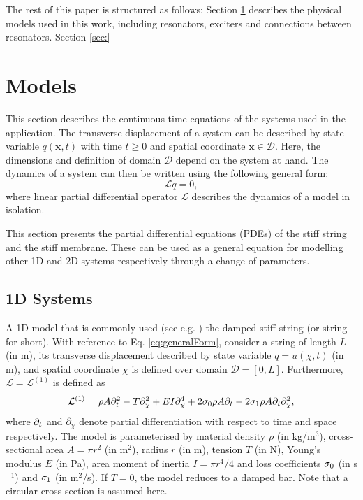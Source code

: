 \documentclass{article}
\begin{document}
The rest of this paper is structured as follows: Section \ref{sec:models} describes the physical models used in this work, including resonators, exciters and connections between resonators. Section \ref{sec:}

\section{Models}\label{sec:models}
This section describes the continuous-time equations of the systems used in the application. The transverse displacement of a system can be described by state variable $q(\boldsymbol{x}, t)$ with time $t\geq 0$ and spatial coordinate $\boldsymbol{x}\in \mathcal{D}$. Here, the dimensions and definition of domain $\mathcal{D}$ depend on the system at hand. The dynamics of a system can then be written using the following general form:
\begin{equation}\label{eq:generalForm}
    \mathcal{L}q = 0,
\end{equation}
where linear partial differential operator $\mathcal{L}$ describes the dynamics of a model in isolation.

This section presents the partial differential equations (PDEs) of the stiff string and the stiff membrane. These can be used as a general equation for modelling other 1D and 2D systems respectively through a change of parameters. 


\subsection{1D Systems}
A 1D model that is commonly used (see e.g. \cite{Willemsen2019, Bilbao2019}) the damped stiff string (or string for short). With reference to Eq. \eqref{eq:generalForm}, consider a string of length $L$ (in m), its transverse displacement described by state variable $q = u(\chi, t)$ (in m), and spatial coordinate $\chi$ is defined over domain $\mathcal{D} = [0, L]$. Furthermore, $\mathcal{L}=\mathcal{L}^{(\text{1})}$ is defined as \cite{Bensa2003}
\begin{equation}\label{eq:stiffString}
    \mathcal{L}^{(1)}= \rho A\partial_t^2 - T\partial_{\chi}^2 + E I \partial_{\chi}^4 + 2\sigma_{0}\rho A\partial_t - 2 \sigma_{1}\rho A\partial_t\partial_{\chi}^2,
\end{equation}
where $\partial_t$ and $\partial_\chi$ denote partial differentiation with respect to time and space respectively. The model is parameterised by material density $\rho$ (in kg/m$^3$), cross-sectional area $A = \pi r^2$ (in m$^2$), radius $r$ (in m), tension $T$ (in N), Young's modulus $E$ (in Pa), area moment of inertia $I = \pi r^4/4$ and loss coefficients $\sigma_{0}$ (in s$^{-1}$) and $\sigma_{1}$ (in m$^2$/s). If $T=0$, the model reduces to a damped bar. Note that a circular cross-section is assumed here. 
\end{document}
